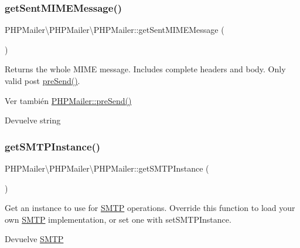 \subsubsection{\texorpdfstring{get\+Sent\+M\+I\+M\+E\+Message()}{getSentMIMEMessage()}}
{\footnotesize\ttfamily P\+H\+P\+Mailer\textbackslash{}\+P\+H\+P\+Mailer\textbackslash{}\+P\+H\+P\+Mailer\+::get\+Sent\+M\+I\+M\+E\+Message (\begin{DoxyParamCaption}{ }\end{DoxyParamCaption})}

Returns the whole M\+I\+ME message. Includes complete headers and body. Only valid post \hyperlink{classPHPMailer_1_1PHPMailer_1_1PHPMailer_a7ddedbf5d2a898f84d8d99c947740d2c}{pre\+Send()}.

\begin{DoxySeeAlso}{Ver también}
\hyperlink{classPHPMailer_1_1PHPMailer_1_1PHPMailer_a7ddedbf5d2a898f84d8d99c947740d2c}{P\+H\+P\+Mailer\+::pre\+Send()}
\end{DoxySeeAlso}
\begin{DoxyReturn}{Devuelve}
string 
\end{DoxyReturn}
\mbox{\label{classPHPMailer_1_1PHPMailer_1_1PHPMailer_ace53c3eab6221b084479efe01a01ed94}} 
\subsubsection{\texorpdfstring{get\+S\+M\+T\+P\+Instance()}{getSMTPInstance()}}
{\footnotesize\ttfamily P\+H\+P\+Mailer\textbackslash{}\+P\+H\+P\+Mailer\textbackslash{}\+P\+H\+P\+Mailer\+::get\+S\+M\+T\+P\+Instance (\begin{DoxyParamCaption}{ }\end{DoxyParamCaption})}

Get an instance to use for \hyperlink{classPHPMailer_1_1PHPMailer_1_1SMTP}{S\+M\+TP} operations. Override this function to load your own \hyperlink{classPHPMailer_1_1PHPMailer_1_1SMTP}{S\+M\+TP} implementation, or set one with set\+S\+M\+T\+P\+Instance.

\begin{DoxyReturn}{Devuelve}
\hyperlink{classPHPMailer_1_1PHPMailer_1_1SMTP}{S\+M\+TP} 
\end{DoxyReturn}
\mbox{\label{classPHPMailer_1_1PHPMailer_1_1PHPMailer_ac596be7d0d97c21a1fb50898b58905a0}} 
